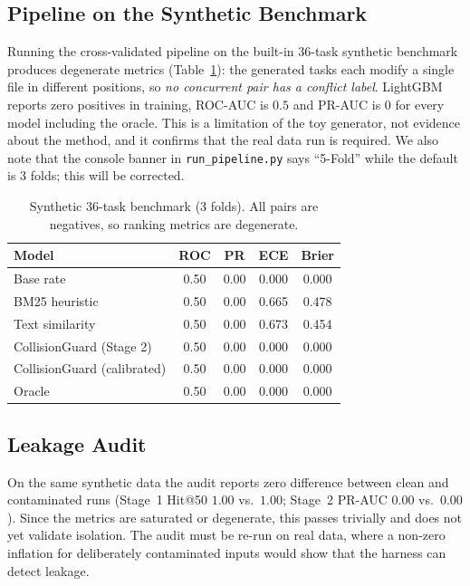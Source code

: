 \documentclass[sigconf, authorversion, nonacm]{acmart}
\begin{document}
\subsection{Pipeline on the Synthetic Benchmark}
Running the cross-validated pipeline on the built-in 36-task synthetic benchmark produces degenerate metrics (Table~\ref{tab:synth}): the generated tasks each modify a single file in different positions, so \emph{no concurrent pair has a conflict label}. LightGBM reports zero positives in training, ROC-AUC is $0.5$ and PR-AUC is $0$ for every model including the oracle. This is a limitation of the toy generator, not evidence about the method, and it confirms that the real data run is required. We also note that the console banner in \texttt{run\_pipeline.py} says ``5-Fold'' while the default is 3 folds; this will be corrected.

\begin{table}[h]
  \caption{Synthetic 36-task benchmark (3 folds). All pairs are negatives, so ranking metrics are degenerate.}
  \label{tab:synth}
  \small
  \begin{tabular}{lcccc}
    \toprule
    Model & ROC & PR & ECE & Brier \\
    \midrule
    Base rate & 0.50 & 0.00 & 0.000 & 0.000 \\
    BM25 heuristic & 0.50 & 0.00 & 0.665 & 0.478 \\
    Text similarity & 0.50 & 0.00 & 0.673 & 0.454 \\
    CollisionGuard (Stage 2) & 0.50 & 0.00 & 0.000 & 0.000 \\
    CollisionGuard (calibrated) & 0.50 & 0.00 & 0.000 & 0.000 \\
    Oracle & 0.50 & 0.00 & 0.000 & 0.000 \\
    \bottomrule
  \end{tabular}
\end{table}

\subsection{Leakage Audit}
On the same synthetic data the audit reports zero difference between clean and contaminated runs (Stage~1 Hit@50 $1.00$ vs.\ $1.00$; Stage~2 PR-AUC $0.00$ vs.\ $0.00$). Since the metrics are saturated or degenerate, this passes trivially and does not yet validate isolation. The audit must be re-run on real data, where a non-zero inflation for deliberately contaminated inputs would show that the harness can detect leakage.
\end{document}

